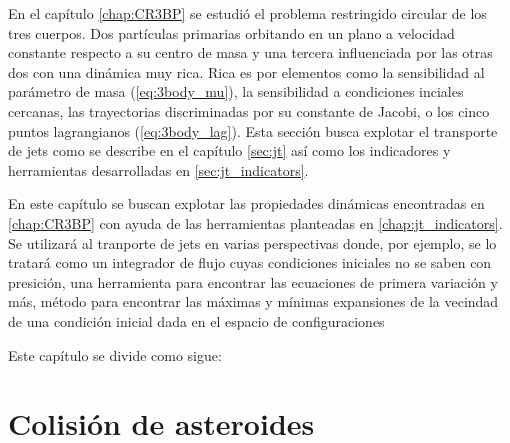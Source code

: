 En el capítulo \ref{chap:CR3BP} se estudió el problema restringido circular de los tres cuerpos. Dos partículas primarias orbitando en un plano a velocidad constante respecto a su centro de masa y una tercera influenciada por las otras dos con una dinámica muy rica. Rica es por elementos como la sensibilidad al parámetro de masa (\ref{eq:3body_mu}), la sensibilidad a condiciones inciales cercanas, las trayectorias discriminadas por su constante de Jacobi, o los cinco puntos lagrangianos (\ref{eq:3body_lag}). Esta sección busca explotar el transporte de jets como se describe en el capítulo \ref{sec:jt} así como los indicadores y herramientas desarrolladas en \ref{sec:jt_indicators}. 

En este capítulo se buscan explotar las propiedades dinámicas encontradas en \ref{chap:CR3BP} con ayuda de las herramientas planteadas en \ref{chap:jt_indicators}. Se utilizará al tranporte de jets en varias perspectivas donde, por ejemplo, se lo tratará como un integrador de flujo cuyas condiciones iniciales no se saben con presición, una herramienta para encontrar las ecuaciones de primera variación y más, método para encontrar las máximas y mínimas expansiones de la vecindad de una condición inicial dada en el espacio de configuraciones

Este capítulo se divide como sigue: 


\section{Colisión de asteroides}





